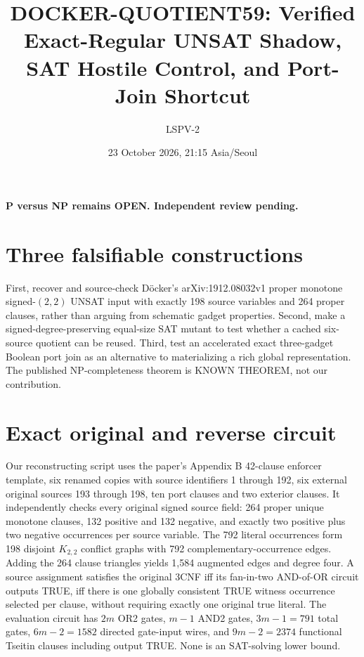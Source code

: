 \documentclass[10pt]{article}
\title{DOCKER-QUOTIENT59: Verified Exact-Regular UNSAT Shadow, SAT Hostile Control, and Port-Join Shortcut}
\author{LSPV-2}
\date{23 October 2026, 21:15 Asia/Seoul}
\begin{document}
\maketitle
\begin{center}\textbf{P versus NP remains OPEN. Independent review pending.}\end{center}

\section{Three falsifiable constructions}
First, recover and source-check D\"ocker's arXiv:1912.08032v1 proper monotone signed-$(2,2)$ UNSAT input with exactly 198 source variables and 264 proper clauses, rather than arguing from schematic gadget properties. Second, make a signed-degree-preserving equal-size SAT mutant to test whether a cached six-source quotient can be reused. Third, test an accelerated exact three-gadget Boolean port join as an alternative to materializing a rich global representation. The published NP-completeness theorem is KNOWN THEOREM, not our contribution.

\section{Exact original and reverse circuit}
Our reconstructing script uses the paper's Appendix B 42-clause enforcer template, six renamed copies with source identifiers 1 through 192, six external original sources 193 through 198, ten port clauses and two exterior clauses. It independently checks every original signed source field: 264 proper unique monotone clauses, 132 positive and 132 negative, and exactly two positive plus two negative occurrences per source variable. The 792 literal occurrences form 198 disjoint $K_{2,2}$ conflict graphs with 792 complementary-occurrence edges. Adding the 264 clause triangles yields 1,584 augmented edges and degree four. A source assignment satisfies the original 3CNF iff its fan-in-two AND-of-OR circuit outputs TRUE, iff there is one globally consistent TRUE witness occurrence selected per clause, without requiring exactly one original true literal. The evaluation circuit has $2m$ OR2 gates, $m-1$ AND2 gates, $3m-1=791$ total gates, $6m-2=1582$ directed gate-input wires, and $9m-2=2374$ functional Tseitin clauses including output TRUE. None is an SAT-solving lower bound.
\end{document}
